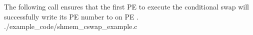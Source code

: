 \begin{apidefinition}


\begin{apiexamples}

\apicexample
    {The following call ensures that the first \ac{PE} to execute the
    conditional swap will successfully write its \ac{PE} number to
     on \ac{PE} .}
    {./example_code/shmem_cswap_example.c}
    {}

\end{apiexamples}

\end{apidefinition}
